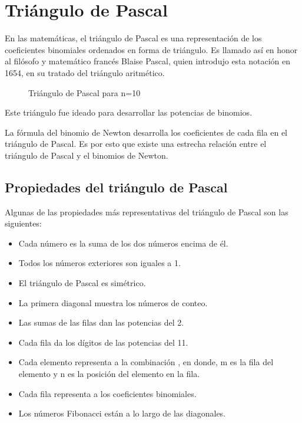 \section{Triángulo de Pascal}

En las matemáticas, el triángulo de Pascal es una representación de los
coeficientes binomiales ordenados en forma de triángulo. Es llamado así en honor
al filósofo y matemático francés Blaise Pascal, quien introdujo esta notación en
1654, en su tratado del triángulo aritmético.

\newcommand{\pasc}[2]{
	\pgfkeys{/pgf/fpu}
	\pgfmathparse{round(#1!/((#1-#2)!*#2!))}
	\pgfmathfloattoint{\pgfmathresult}
	\pgfmathresult
}

\begin{figure}[h]
	\centering
	\caption{Triángulo de Pascal para n=10}
	\label{fig:pascalTriangle}
\end{figure}

Este triángulo fue ideado para desarrollar las potencias de binomios.

La fórmula del binomio de Newton desarrolla los coeficientes de cada fila en el
triángulo de Pascal. Es por esto que existe una estrecha relación entre el
triángulo de Pascal y el binomios de Newton.

\subsection{Propiedades del triángulo de Pascal}

Algunas de las propiedades más representativas del triángulo de Pascal son las
siguientes:

\begin{itemize}
	\item Cada número es la suma de los dos números encima de él.
	\item Todos los números exteriores son iguales a 1.
	\item El triángulo de Pascal es simétrico.
	\item La primera diagonal muestra los números de conteo.
	\item Las sumas de las filas dan las potencias del 2.
	\item Cada fila da los dígitos de las potencias del 11.
	\item Cada elemento representa a la combinación , en donde, m es la fila del elemento y n es la posición del elemento en la fila.
	\item Cada fila representa a los coeficientes binomiales.
	\item Los números Fibonacci están a lo largo de las diagonales.
\end{itemize}

